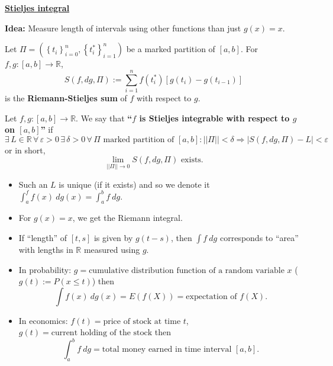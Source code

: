 \documentclass{notes}
\begin{document}
  \newpage
  
  {\boldmath \bfseries \underline{Stieljes integral}}
  
  {\boldmath \bfseries Idea:} Measure length of intervals using other functions than just $g(x) = x$.
  
  \begin{defn}
    Let $\Pi = (\left \{ t_i \right \}_{i = 0}^n, \left \{ t^*_i \right \}_{i = 1}^n)$ be a marked partition of $[a, b]$.
    For $f, g \colon [a, b] \to \mathbb R$, 
    \[
      S(f, dg, \Pi) := \sum_{i = 1}^n f(t^*_i) [g(t_i) - g(t_{i - 1})]
    \]
    is the {\boldmath \bfseries Riemann-Stieljes sum} of $f$ with respect to $g$.
  \end{defn}
  
  \begin{defn}
    Let $f, g \colon [a, b] \to \mathbb R$.
    We say that {\boldmath \bfseries ``$f$ is Stieljes integrable with respect to $g$ on $[a, b]$''} if 
    \[
      \exists \, L \in \mathbb R \, \forall \, \varepsilon > 0 \, \exists \, \delta > 0 \, \forall \, \Pi \text{ marked partition of $[a, b]$}: ||\Pi|| < \delta \Rightarrow \left | S(f, dg, \Pi) - L \right | < \varepsilon
    \]
    or in short, 
    \[
      \lim_{||\Pi|| \to 0} S(f, dg, \Pi) \text{ exists.}
    \]
  \end{defn}
  
  \begin{note}
    \begin{itemize}
      \item Such an $L$ is unique (if it exists) and so we denote it $\int_a^f f(x)\ dg(x) = \int_a^b f\ dg$.

      \item For $g(x) = x$, we get the Riemann integral.
        
      \item If ``length'' of $[t, s]$ is given by $g(t - s)$, then $\int f\ dg$ corresponds to ``area'' with lengths in $\mathbb R$ measured using $g$.
        
      \item In probability: $g = \text{cumulative distribution function of a random variable $x$}$ ($g(t) := P(x \leq t)$) then 
      \[
        \int f(x)\ dg(x) = E(f(X)) = \text{expectation of $f(X)$}.
      \]
      
      \item In economics: $f(t) = \text{price of stock at time $t$}$, $g(t) = \text{current holding of the stock}$ then 
      \[
        \int_a^b f\ dg = \text{total money earned in time interval $[a, b]$.}
      \]
    \end{itemize}
  \end{note}
\end{document}
